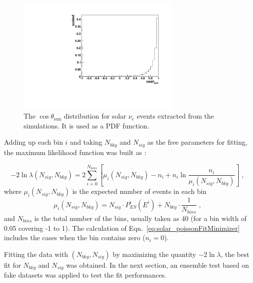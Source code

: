 \begin{figure}[!htb]
	\centering
	\includegraphics[width=8cm]{solarPDF.pdf}
	\caption[The $\cos\theta_\mathrm{sun}$ distribution of solar $\nu_e$ used as a PDF function.]{The $\cos\theta_\mathrm{sun}$ distribution for solar $\nu_e$ events extracted from the simulations. It is used as a PDF function.\label{solarPDF}}
\end{figure}

Adding up each bin $i$ and taking $N_{bkg}$ and $N_{sig}$ as the free parameters for fitting, the maximum likelihood function was built as \cite{pdg2020}:

\begin{equation}\label{eq:solar_poissonFitMinimizer}
-2\ln\mathcal \lambda(N_{sig},N_{bkg})
=2\sum_{i=0}^{N_{bins}}[\mu_i(N_{sig},N_{bkg})-n_i+n_i\ln\frac{n_i}{\mu_i(N_{sig},N_{bkg})}]\; ,
\end{equation}
where $\mu_i(N_{sig},N_{bkg})$ is the expected number of events in each bin
\begin{equation*}
\mu_i(N_{sig},N_{bkg})=N_{sig}\cdot P^i_{ES}(E^i)+N_{bkg}\cdot\frac{1}{N_{bins}}\; ,
\end{equation*}
and $N_{bins}$ is the total number of the bins, usually taken as 40 (for a bin width of 0.05 covering -1 to 1). The calculation of Eqn.~\ref{eq:solar_poissonFitMinimizer} includes the cases when the bin contains zero ($n_i=0$).

Fitting the data with $(N_{bkg},N_{sig})$ by maximizing the quantity $-2\ln\mathcal\lambda$, the best fit for $N_{bkg}$ and $N_{sig}$ was obtained. In the next section, an ensemble test based on fake datasets was applied to test the fit performances.
%
%
